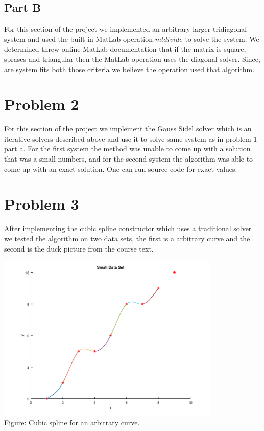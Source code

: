 \documentclass{article}
\begin{document}
\subsection*{Part B}
For this section of the project we implemented an arbitrary larger tridiagonal system and used the built in MatLab operation $mldivide$ to solve the system. We determined threw online MatLab documentation that if the matrix is square, sprases and triangular then the MatLab operation uses the diagonal solver. Since, are system fits both those criteria we believe the operation used that algorithm.  

\section*{Problem 2}
For this section of the project we implement the Gauss Sidel solver which is an iterative solvers described above and use it to solve same system as in problem 1 part a. For the first system the method was unable to come up with a solution that was a small numbers, and for the second system the algorithm was able to come up with an exact solution. One can run source code for exact values. 

\section*{Problem 3}
After implementing the cubic spline constructor which uses a traditional solver we tested the algorithm on two data sets, the first is a arbitrary curve and the second is the duck picture from the course text.  

\includegraphics[height=8cm]{problem3a.png}\\
Figure: Cubic spline for an arbitrary curve.
\end{document}
